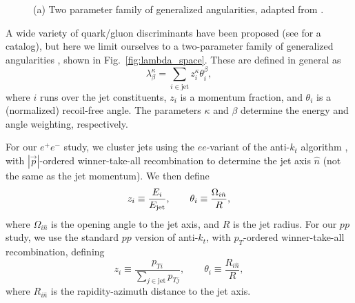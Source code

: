 \documentclass[11pt,letterpaper]{article}
\newcommand{\genang}[2]{{\lambda^{#1}_{#2}}}
\DeclareRobustCommand{\Fig}[1]{Fig.~\ref{#1}}
\newcommand{\be}{\begin{equation}}
\newcommand{\ee}{\end{equation}}
\begin{document}
\begin{figure}
\centering
{}
\caption{(a) Two parameter family of generalized angularities, adapted from \cite{}.}
\end{figure}

A wide variety of quark/gluon discriminants have been proposed (see \cite{} for a catalog), but here we limit ourselves to a two-parameter family of generalized angularities \cite{}, shown in \Fig{fig:lambda_space}.  These are defined in general as
\begin{equation}
\label{eq:genang}
\genang{\kappa}{\beta} = \sum_{i \in \text{jet}} z_i^\kappa \theta_i^\beta,
\end{equation}
where $i$ runs over the jet constituents, $z_i$ is a momentum fraction, and $\theta_i$ is a (normalized) recoil-free angle. The parameters $\kappa$ and $\beta$ determine the energy and angle weighting, respectively.

For our $e^+ e^-$ study, we cluster jets using the $ee$-variant of the anti-$k_t$ algorithm \cite{}, with $|\vec{p}|$-ordered winner-take-all recombination \cite{} to determine the jet axis $\hat{n}$ (not the same as the jet momentum).  We then define
\be
z_i \equiv \frac{E_i}{E_{\rm jet}}, \qquad \theta_i \equiv \frac{\Omega_{i \hat{n}}}{R},
\ee
where $\Omega_{i \hat{n}}$ is the opening angle to the jet axis, and $R$ is the jet radius.  For our $pp$ study, we use the standard $pp$ version of anti-$k_t$, with $p_T$-ordered winner-take-all recombination, defining
\be
z_i \equiv \frac{p_{Ti}}{\sum_{j \in \text{jet}} p_{Tj}}, \qquad \theta_i \equiv \frac{R_{i \hat{n}}}{R},
\ee
where $R_{i \hat{n}}$ is the rapidity-azimuth distance to the jet axis.
\end{document}
